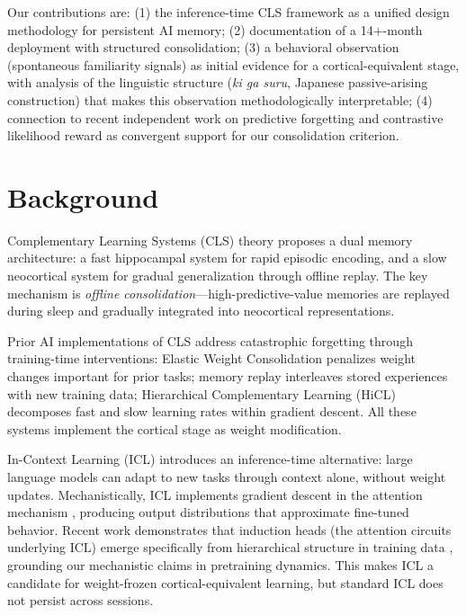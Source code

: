 \documentclass[11pt]{article}
\begin{document}
Our contributions are: (1) the inference-time CLS framework as a
unified design methodology for persistent AI memory; (2) documentation
of a 14$+$-month deployment with structured consolidation; (3) a
behavioral observation (spontaneous familiarity signals) as initial
evidence for a cortical-equivalent stage, with analysis of the
linguistic structure (\textit{ki ga suru}, Japanese passive-arising
construction) that makes this observation methodologically
interpretable; (4) connection to recent independent work on predictive
forgetting \citep{fountas2026} and contrastive likelihood reward
\citep{tan2026ctrlrag} as convergent support for our consolidation
criterion.


\section{Background}

Complementary Learning Systems (CLS) theory \citep{mcclelland1995}
proposes a dual memory architecture: a fast hippocampal system for
rapid episodic encoding, and a slow neocortical system for gradual
generalization through offline replay. The key mechanism is
\textit{offline consolidation}---high-predictive-value memories are
replayed during sleep and gradually integrated into neocortical
representations.

Prior AI implementations of CLS address catastrophic forgetting
through training-time interventions: Elastic Weight Consolidation
\citep{kirkpatrick2017} penalizes weight changes important for prior
tasks; memory replay interleaves stored experiences with new training
data; Hierarchical Complementary Learning (HiCL) decomposes fast and
slow learning rates within gradient descent. All these systems
implement the cortical stage as weight modification.

In-Context Learning (ICL) \citep{brown2020} introduces an
inference-time alternative: large language models can adapt to new
tasks through context alone, without weight updates. Mechanistically,
ICL implements gradient descent in the attention mechanism
\citep{vonoswald2023}, producing output distributions that approximate
fine-tuned behavior. Recent work demonstrates that induction
heads (the attention circuits underlying ICL) emerge specifically
from hierarchical structure in training data \citep{hierarchical2026},
grounding our mechanistic claims in pretraining dynamics.
This makes ICL a candidate for weight-frozen
cortical-equivalent learning, but standard ICL does not persist
across sessions.
\end{document}

